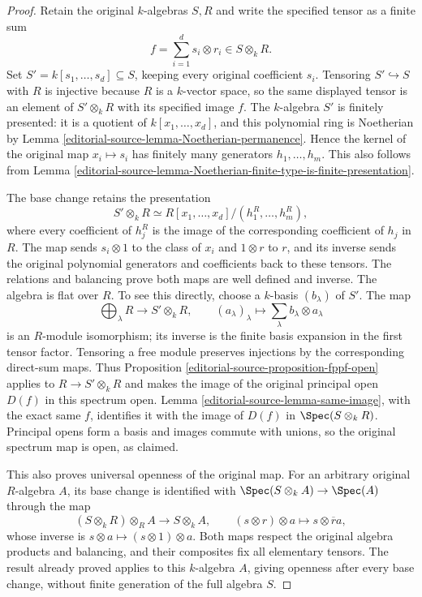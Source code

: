 \begin{proof}
Retain the original $k$-algebras $S,R$ and write the
specified tensor as a finite sum
$$
f=\sum_{i=1}^d s_i\otimes r_i\in S\otimes_kR.
$$
Set $S'=k[s_1,\ldots,s_d]\subseteq S$, keeping every
original coefficient $s_i$. Tensoring $S'\hookrightarrow S$
with $R$ is injective because $R$ is a $k$-vector space,
so the same displayed tensor is an element of
$S'\otimes_kR$ with its specified image $f$.
The $k$-algebra $S'$ is finitely presented: it is
a quotient of $k[x_1,\ldots,x_d]$, and this polynomial
ring is Noetherian by Lemma \ref{editorial-source-lemma-Noetherian-permanence}.
Hence the kernel of the original map $x_i\mapsto s_i$
has finitely many generators $h_1,\ldots,h_m$.
This also follows from
Lemma \ref{editorial-source-lemma-Noetherian-finite-type-is-finite-presentation}.

The base change retains the presentation
$$
S'\otimes_kR\simeq R[x_1,\ldots,x_d]/(h_1^R,\ldots,h_m^R),
$$
where every coefficient of $h_j^R$ is the image of
the corresponding coefficient of $h_j$ in $R$.
The map sends $s_i\otimes1$ to the class of $x_i$
and $1\otimes r$ to $r$, and its inverse sends the
original polynomial generators and coefficients back
to these tensors. The relations and balancing prove
both maps are well defined and inverse.
The algebra is flat over $R$. To see this directly,
choose a $k$-basis $(b_\lambda)$ of $S'$.
The map
$$
\bigoplus_\lambda R\longrightarrow S'\otimes_kR,
\qquad (a_\lambda)_\lambda\longmapsto
\sum_\lambda b_\lambda\otimes a_\lambda
$$
is an $R$-module isomorphism; its inverse is the
finite basis expansion in the first tensor factor.
Tensoring a free module preserves injections by
the corresponding direct-sum maps. Thus
Proposition \ref{editorial-source-proposition-fppf-open} applies to
$R\to S'\otimes_kR$ and makes the image of the
original principal open $D(f)$ in this spectrum
open. Lemma \ref{editorial-source-lemma-same-image}, with the exact
same $f$, identifies it with the image of $D(f)$
in $\Spec(S\otimes_kR)$. Principal opens form a
basis and images commute with unions, so the
original spectrum map is open, as claimed.

This also proves universal openness of the
original map. For an arbitrary original $R$-algebra
$A$, its base change is identified with
$\Spec(S\otimes_kA)\to\Spec(A)$ through the map
$$
(S\otimes_kR)\otimes_RA\longrightarrow S\otimes_kA,
\qquad (s\otimes r)\otimes a\longmapsto s\otimes\overline r a,
$$
whose inverse is $s\otimes a\mapsto(s\otimes1)\otimes a$.
Both maps respect the original algebra products
and balancing, and their composites fix all
elementary tensors. The result already proved
applies to this $k$-algebra $A$, giving openness
after every base change, without finite generation
of the full algebra $S$.


\end{proof}
